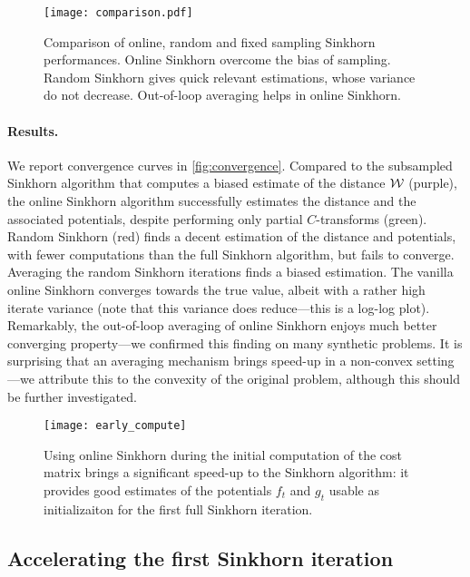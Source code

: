 \begin{figure}[t]
    \centering
    \texttt{[image: comparison.pdf]}
    \caption{Comparison of online, random and fixed sampling Sinkhorn performances. Online Sinkhorn overcome the bias of sampling. Random Sinkhorn gives quick relevant estimations, whose variance do not decrease. Out-of-loop averaging helps in online Sinkhorn.}
    \label{fig:convergence}
\end{figure}

\paragraph{Results.} We report convergence curves in \autoref{fig:convergence}.
Compared to the subsampled Sinkhorn algorithm that computes a biased estimate of
the distance $\mathcal{W}$ (purple), the online Sinkhorn algorithm successfully
estimates the distance and the associated potentials, despite performing only
partial $C$-transforms (green). Random Sinkhorn (red) finds a decent estimation
of the distance and potentials, with fewer computations than the full Sinkhorn
algorithm, but fails to converge. Averaging the random Sinkhorn iterations finds
a biased estimation. The vanilla online Sinkhorn converges towards the true
value, albeit with a rather high iterate variance (note that this variance does
reduce---this is a log-log plot). Remarkably, the out-of-loop averaging of
online Sinkhorn enjoys much better converging property---we confirmed this
finding on many synthetic problems. It is surprising that an averaging mechanism
brings speed-up in a non-convex setting---we attribute this to the convexity of
the original problem, although this should be further investigated.

\begin{figure}[t]
    \centering
    \texttt{[image: early\_compute]}
    \caption{Using online Sinkhorn during the initial computation of the cost
     matrix brings a significant speed-up to the Sinkhorn algorithm: it provides
     good estimates of the potentials $f_t$ and $g_t$ usable as initializaiton
     for the first full Sinkhorn iteration.\label{fig:early_compute}}
\end{figure}

\subsection{Accelerating the first Sinkhorn iteration}\label{sec:accelerating}

